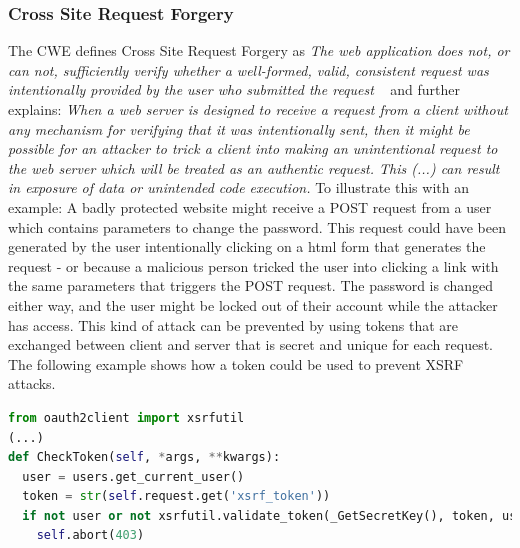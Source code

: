 \documentclass[
	a4paper,
	pagesize,
	pdftex,
	12pt,
	twoside, %
	BCOR=5mm, %
	ngerman,
	fleqn,
	final,
	]{scrartcl}
\begin{document}
\subsubsection{Cross Site Request Forgery}
The CWE defines Cross Site Request Forgery as \textit{The web application does not, or can not, sufficiently verify whether a well-formed, valid, consistent request was intentionally provided by the user who submitted the request} ~\cite{CommonWeaknessEnumeration.19.9.2019b} and further explains: \textit{When a web server is designed to receive a request from a client without any mechanism for verifying that it was intentionally sent, then it might be possible for an attacker to trick a client into making an unintentional request to the web server which will be treated as an authentic request. This (...) can result in exposure of data or unintended code execution.} To illustrate this with an example: A badly protected website might receive a POST request from a user which contains parameters to change the password. This request could have been generated by the user intentionally clicking on a html form that generates the request - or because a malicious person tricked the user into clicking a link with the same parameters that triggers the POST request. The password is changed either way, and the user might be locked out of their account while the attacker has access. This kind of attack can be prevented by using tokens that are exchanged between client and server that is secret and unique for each request. The following example shows how a token could be used to prevent XSRF attacks.
\begin{lstlisting}[language=Python, showstringspaces=False]
from oauth2client import xsrfutil
(...)
def CheckToken(self, *args, **kwargs):
  user = users.get_current_user()
  token = str(self.request.get('xsrf_token'))
  if not user or not xsrfutil.validate_token(_GetSecretKey(), token, user.user_id()):
    self.abort(403)
  
\end{lstlisting}
\end{document}
